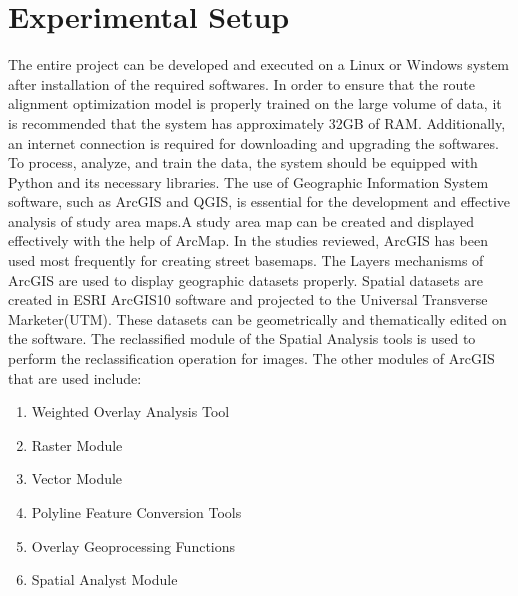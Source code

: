 %

\chapter{Experimental Setup}
The entire project can be developed and executed on a Linux or Windows system after installation of the required softwares. In order to ensure that the route alignment optimization model is properly trained on the large volume of data, it is recommended that the system has approximately 32GB of RAM. Additionally, an internet connection is required for downloading and upgrading the softwares. To process, analyze, and train the data, the system should be equipped with Python and its necessary libraries. The use of Geographic Information System software, such as ArcGIS and QGIS, is essential for the development and effective analysis of study area maps.A study area map can be created and displayed effectively with the help of ArcMap. In the studies reviewed, ArcGIS has been used most frequently for creating street basemaps. The Layers mechanisms of ArcGIS are used to display geographic datasets properly. Spatial datasets are created in ESRI ArcGIS10 software and projected to the Universal Transverse Marketer(UTM). These datasets can be geometrically and thematically edited on the software. The reclassified module of the Spatial Analysis tools is used to perform the reclassification operation for images.
\newline The other modules of ArcGIS that are used include:
\begin{enumerate}
    \item Weighted Overlay Analysis Tool 
    \item Raster Module
    \item Vector Module
    \item Polyline Feature Conversion Tools
    \item Overlay Geoprocessing Functions
    \item Spatial Analyst Module
\end{enumerate}

\begin{figure}[htbp]			%
\begin{center}
\label{circle}
\end{center}
\end{figure}

